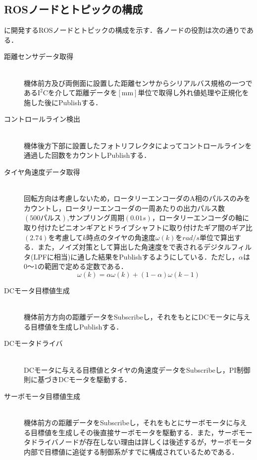 \newpage
\subsection{ROSノードとトピックの構成}
に開発するROSノードとトピックの構成を示す．各ノードの役割は次の通りである．
\begin{description}

    \item[距離センサデータ取得] \mbox{} \\
      機体前方及び両側面に設置した距離センサからシリアルバス規格の一つである$\mathrm{I^2C}$を介して距離データを$\mathrm{[mm]}$単位で取得し外れ値処理や正規化を施した後にPublishする．
    \item[コントロールライン検出] \mbox{} \\
      機体後方下部に設置したフォトリフレクタによってコントロールラインを通過した回数をカウントしPublishする．

    \item[タイヤ角速度データ取得] \mbox{} \\
      回転方向は考慮しないため，ロータリーエンコーダのA相のパルスのみをカウントし，ロータリーエンコーダの一周あたりの出力パルス数$(500パルス)$,サンプリング周期$(0.01\unit{s})$，ロータリーエンコーダの軸に取り付けたピニオンギアとドライブシャフトに取り付けたギア間のギア比$(2.74)$を考慮して$k$時点のタイヤの角速度$\omega(k)$を$\unit{rad/s}$単位で算出する．また，ノイズ対策として算出した角速度をで表されるデジタルフィルタ(LPFに相当)に通した結果をPublishするようにしている．ただし，$\alpha$は$0〜1$の範囲で定める定数である．\\
      \begin{equation}
      	\omega(k)=\alpha\omega(k)+(1-\alpha)\omega(k-1)\label{eq::lpf}
      \end{equation}

    \item[DCモータ目標値生成] \mbox{} \\
      機体前方方向の距離データをSubscribeし，それをもとにDCモータに与える目標値を生成しPublishする．

    \item[DCモータドライバ] \mbox{} \\
      DCモータに与える目標値とタイヤの角速度データをSubscribeし，PI制御則に基づきDCモータを駆動する．

    \item[サーボモータ目標値生成] \mbox{} \\
      機体前方の距離データをSubscribeし，それをもとにサーボモータに与える目標値を生成しその後直接サーボモータを駆動する．また，サーボモータドライバノードが存在しない理由は詳しくは後述するが，サーボモータ内部で目標値に追従する制御系がすでに構成されているためである．

  \end{description}
